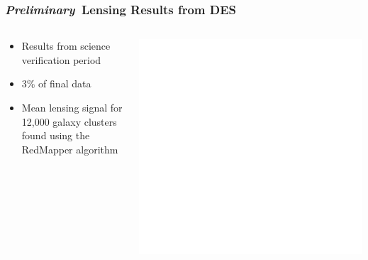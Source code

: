\documentclass{beamer}
\newcommand{\prelim}{{\bf{\it Preliminary}}}
\begin{document}
\frame
{

    \frametitle{\prelim\ Lensing Results from DES}

 
    \begin{columns}
        \begin{column}{0.5\textwidth}    
            \begin{itemize}

                \item Results from science verification period

                \item {\color{gold} 3\% of final data }

                \item Mean lensing signal for 12,000 galaxy clusters found
                    using the RedMapper algorithm

            \end{itemize}
        \end{column}
        \begin{column}{0.5\textwidth}
            \begin{center}
                \includegraphics[width=\textwidth]{run-rm008-bin-zwide-jack-icolor.pdf}
                \newline
            \end{center}
        \end{column}
    \end{columns}

}
\end{document}

